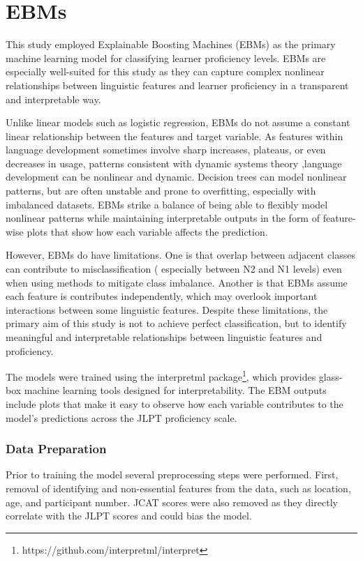 \section{EBMs}
This study employed Explainable Boosting Machines (EBMs) \citep{nori2019} as the primary machine learning model for
classifying learner proficiency levels. EBMs are especially well-suited for this study as they can capture complex
nonlinear relationships between linguistic features and learner proficiency in a transparent and interpretable way.

Unlike linear models such as logistic regression, EBMs do not assume a constant linear relationship
between the features and target variable. As features within language development
sometimes involve sharp increases, plateaus, or even decreases in usage, patterns consistent with dynamic
systems
theory \citet{
Debot2007},language
development can be nonlinear and dynamic. Decision trees can model nonlinear patterns, but are often unstable and
prone to
overfitting, especially with imbalanced
datasets. EBMs strike a balance of being able to flexibly model nonlinear patterns while maintaining interpretable
outputs in the form of feature-wise plots that show how each variable affects the prediction.

However, EBMs do have limitations. One is that overlap between adjacent classes can contribute to misclassification (
especially
between N2 and N1 levels) even when using methods to mitigate class imbalance. Another is that EBMs assume each
feature is contributes independently, which may overlook important interactions between some linguistic features.
Despite
these limitations, the primary aim of this study is not to achieve perfect
classification, but to identify meaningful and interpretable relationships between linguistic
features and
proficiency.

The models were trained using the interpretml package\footnote{https://github.com/interpretml/interpret}, which
provides glass-box machine learning tools designed for interpretability. The EBM outputs include plots that make it
easy to observe how each variable contributes to the model's predictions across the JLPT proficiency scale.


\subsubsection{Data Preparation}
Prior to training the model several preprocessing steps were performed. First, removal of identifying and non-essential
features from the data, such as location, age, and participant number. JCAT scores were also removed as they
directly correlate with the JLPT scores and could bias the model.

